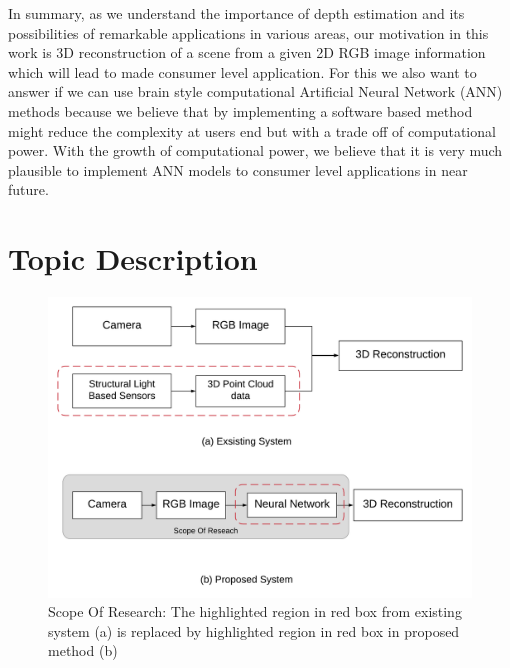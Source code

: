 In summary, as we understand the importance of depth estimation and its possibilities of remarkable applications in various areas, our motivation in this work is 3D reconstruction of a scene from a given 2D RGB image information which will lead to made consumer level application. For this we also want to answer if we can use brain style computational Artificial Neural Network (ANN) methods because we believe that by implementing a software based method might reduce the complexity at users end but with a trade off of computational power. With the growth of computational power, we believe that it is very much plausible to implement ANN models to consumer level applications in near future.

\section{Topic Description}
\label{Chapeter1:Topic_Description}
\begin{figure}[h]
    \centering
    \includegraphics[width = 12cm]{Figures/idea.png}
    \caption{Scope Of Research: The highlighted region in red box from existing system (a) is replaced by highlighted region in red box in proposed method (b)}
    \label{fig:Proposed_Model}
\end{figure}{}
